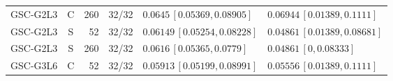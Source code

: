 \begin{longtable}{lcrcp{44mm}p{44mm}}
GSC-G2L3 & C & 260 & 32/32 & \(0.0645\,[0.05369,0.08905]\) & \(0.06944\,[0.01389,0.1111]\)\\
GSC-G2L3 & S & 52 & 32/32 & \(0.06149\,[0.05254,0.08228]\) & \(0.04861\,[0.01389,0.08681]\)\\
GSC-G2L3 & S & 260 & 32/32 & \(0.0616\,[0.05365,0.0779]\) & \(0.04861\,[0,0.08333]\)\\
GSC-G3L6 & C & 52 & 32/32 & \(0.05913\,[0.05199,0.08991]\) & \(0.05556\,[0.01389,0.1111]\)\\

\end{longtable}
